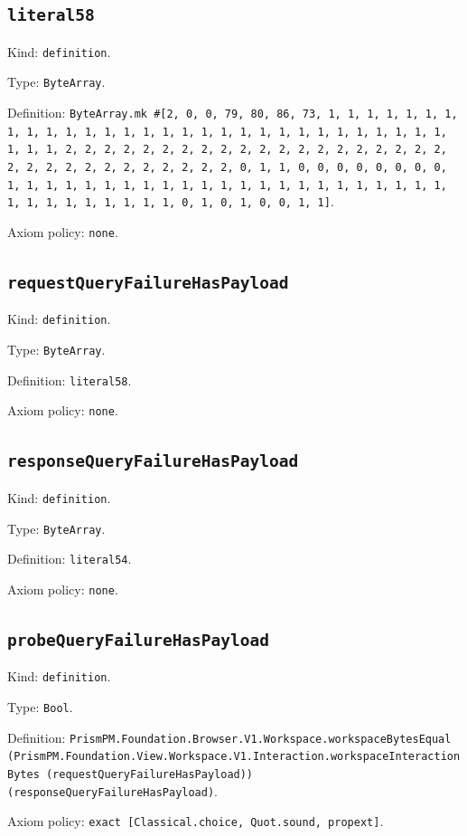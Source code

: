 \documentclass[11pt]{article}
\begin{document}
\subsection*{\texttt{literal58}}
\noindent Kind: \texttt{definition}.\par
\noindent Type: \texttt{ByteArray}.\par
\noindent Definition: \texttt{ByteArray.mk \#[2, 0, 0, 79, 80, 86, 73, 1, 1, 1, 1, 1, 1, 1, 1, 1, 1, 1, 1, 1, 1, 1, 1, 1, 1, 1, 1, 1, 1, 1, 1, 1, 1, 1, 1, 1, 1, 1, 1, 1, 2, 2, 2, 2, 2, 2, 2, 2, 2, 2, 2, 2, 2, 2, 2, 2, 2, 2, 2, 2, 2, 2, 2, 2, 2, 2, 2, 2, 2, 2, 2, 2, 0, 1, 1, 0, 0, 0, 0, 0, 0, 0, 0, 1, 1, 1, 1, 1, 1, 1, 1, 1, 1, 1, 1, 1, 1, 1, 1, 1, 1, 1, 1, 1, 1, 1, 1, 1, 1, 1, 1, 1, 1, 1, 1, 0, 1, 0, 1, 0, 0, 1, 1]}.\par
\noindent Axiom policy: \texttt{none}.\par
\subsection*{\texttt{requestQueryFailureHasPayload}}
\noindent Kind: \texttt{definition}.\par
\noindent Type: \texttt{ByteArray}.\par
\noindent Definition: \texttt{literal58}.\par
\noindent Axiom policy: \texttt{none}.\par
\subsection*{\texttt{responseQueryFailureHasPayload}}
\noindent Kind: \texttt{definition}.\par
\noindent Type: \texttt{ByteArray}.\par
\noindent Definition: \texttt{literal54}.\par
\noindent Axiom policy: \texttt{none}.\par
\subsection*{\texttt{probeQueryFailureHasPayload}}
\noindent Kind: \texttt{definition}.\par
\noindent Type: \texttt{Bool}.\par
\noindent Definition: \texttt{PrismPM.Foundation.Browser.V1.Workspace.workspaceBytesEqual (PrismPM.Foundation.View.Workspace.V1.Interaction.workspaceInteractionBytes (requestQueryFailureHasPayload)) (responseQueryFailureHasPayload)}.\par
\noindent Axiom policy: \texttt{exact [Classical.choice, Quot.sound, propext]}.\par
\end{document}
